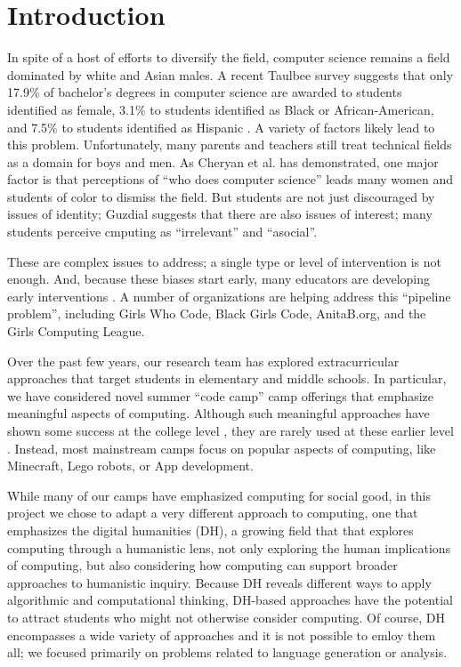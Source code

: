 \section{Introduction}

In spite of a host of efforts to diversify the field, computer
science remains a field dominated by white and Asian males.  A
recent Taulbee survey \cite{Taulbee2016} suggests that only 17.9\%
of bachelor's degrees in computer science are awarded to students
identified as female, 3.1\% to students identified as Black or
African-American, and 7.5\% to students identified as Hispanic
\cite{Taulbee2016}.  A variety of factors likely lead to this
problem.  Unfortunately, many parents and teachers still treat
technical fields as a domain for boys and men.  As Cheryan et al.
\cite{Cheryan2010} has demonstrated, one major factor is that
perceptions of ``who does computer science'' leads many women and
students of color to dismiss the field.  But students are not
just discouraged by issues of identity; Guzdial \cite{Guzdial2009}
suggests that there are also issues of interest; many students
perceive cmputing as ``irrelevant'' and ``asocial''.

These are complex issues to address; a single type or level of
intervention is not enough.  And, because these biases start early,
many educators are developing early interventions
\cite{McGill2015,Decker2016}.  A number of organizations are helping
address this ``pipeline problem'', including Girls Who Code,
Black Girls Code, AnitaB.org, and the Girls Computing League.

Over the past few years, our research team has explored extracurricular
approaches that target students in elementary and middle schools.
In particular, we have considered novel summer ``code camp'' camp
offerings that emphasize meaningful aspects of computing.  Although
such meaningful approaches have shown some success at the college
level \cite{Goldweber2013, Goldweber2018}, they are rarely used at
these earlier level \cite{DeWitt2017}.  Instead,
most mainstream camps focus on popular aspects of computing, like
Minecraft, Lego robots, or App development.

While many of our camps have emphasized computing for social good,
in this project we chose to adapt a very different approach to
computing, one that emphasizes the digital humanities (DH), a growing
field that that explores computing through a humanistic lens, not
only exploring the human implications of computing, but also
considering how computing can support broader approaches to humanistic
inquiry.  Because DH reveals different ways to apply algorithmic
and computational thinking, DH-based approaches have the potential
to attract students who might not otherwise consider computing.  Of
course, DH encompasses a wide variety of approaches and it is not
possible to emloy them all; we focused primarily on problems related
to language generation or analysis.

